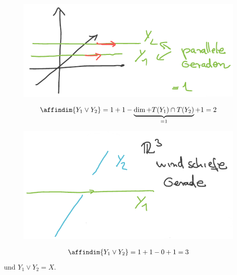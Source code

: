 \begin{beispiel*}[\( X=\reals^3 \)]
    \begin{figure}[H]
        \centering
        \includegraphics[width=0.5\linewidth]{figures/verbindungsraum_parallele_geraden}
        \label{fig:verbindungsraum_parallele_geraden}
    \end{figure}
    \begin{align*}
        \affindim{Y_1\vee Y_2}=1+1-\underbrace{\dim+{T(Y_1)\cap T(Y_2)}}_{=1}+1=2
    \end{align*}
    \begin{figure}[H]
        \centering
        \includegraphics[width=0.6\linewidth]{figures/verbindungsraum_windschiefe_geraden}
        \label{fig:verbindungsraum_windschiefe_geraden}
    \end{figure}
    \begin{align*}
        \affindim{Y_1\vee Y_2}=1+1-0+1=3
    \end{align*}
    und \( Y_1\vee Y_2=X \).
    
\end{beispiel*}
